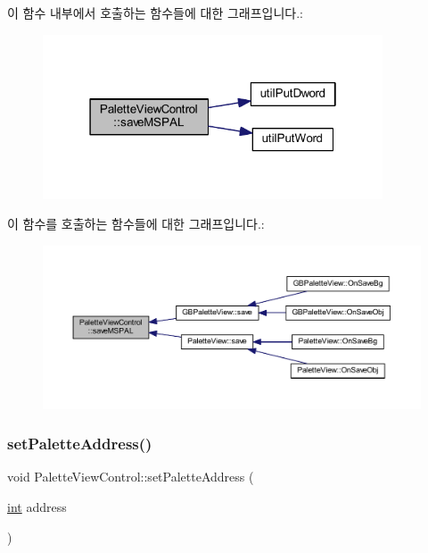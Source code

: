 이 함수 내부에서 호출하는 함수들에 대한 그래프입니다.\+:
\nopagebreak
\begin{figure}[H]
\begin{center}
\leavevmode
\includegraphics[width=286pt]{class_palette_view_control_a0e2249bb157bf7fb36b128a83bf108b5_cgraph}
\end{center}
\end{figure}
이 함수를 호출하는 함수들에 대한 그래프입니다.\+:
\nopagebreak
\begin{figure}[H]
\begin{center}
\leavevmode
\includegraphics[width=350pt]{class_palette_view_control_a0e2249bb157bf7fb36b128a83bf108b5_icgraph}
\end{center}
\end{figure}
\mbox{\label{class_palette_view_control_af552330a1e761f659936d3dd628f9a81}} 
\subsubsection{\texorpdfstring{set\+Palette\+Address()}{setPaletteAddress()}}
{\footnotesize\ttfamily void Palette\+View\+Control\+::set\+Palette\+Address (\begin{DoxyParamCaption}\item[{\mbox{\hyperlink{_util_8cpp_a0ef32aa8672df19503a49fab2d0c8071}{int}}}]{address }\end{DoxyParamCaption})}



